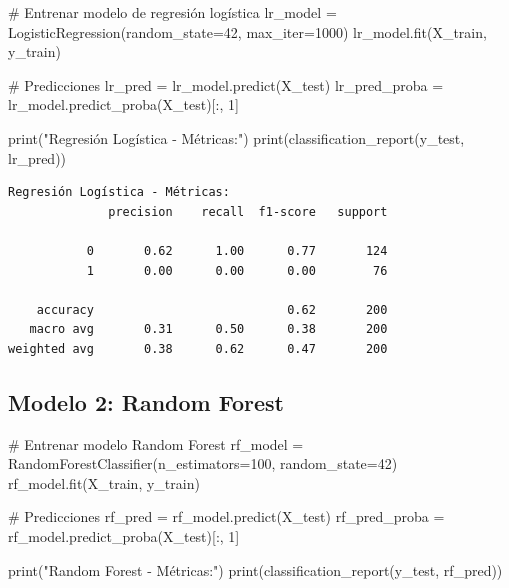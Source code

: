 \documentclass[
]{article}
\newenvironment{Shaded}{\begin{snugshade}}{\end{snugshade}}
\newcommand{\BuiltInTok}[1]{\textcolor[rgb]{0.00,0.23,0.31}{#1}}
\newcommand{\CommentTok}[1]{\textcolor[rgb]{0.37,0.37,0.37}{#1}}
\newcommand{\DecValTok}[1]{\textcolor[rgb]{0.68,0.00,0.00}{#1}}
\newcommand{\NormalTok}[1]{\textcolor[rgb]{0.00,0.23,0.31}{#1}}
\newcommand{\OperatorTok}[1]{\textcolor[rgb]{0.37,0.37,0.37}{#1}}
\newcommand{\StringTok}[1]{\textcolor[rgb]{0.13,0.47,0.30}{#1}}
\begin{document}
\label{logistic-regression}
\begin{Shaded}
\begin{Highlighting}[]
\CommentTok{\# Entrenar modelo de regresión logística}
\NormalTok{lr\_model }\OperatorTok{=}\NormalTok{ LogisticRegression(random\_state}\OperatorTok{=}\DecValTok{42}\NormalTok{, max\_iter}\OperatorTok{=}\DecValTok{1000}\NormalTok{)}
\NormalTok{lr\_model.fit(X\_train, y\_train)}

\CommentTok{\# Predicciones}
\NormalTok{lr\_pred }\OperatorTok{=}\NormalTok{ lr\_model.predict(X\_test)}
\NormalTok{lr\_pred\_proba }\OperatorTok{=}\NormalTok{ lr\_model.predict\_proba(X\_test)[:, }\DecValTok{1}\NormalTok{]}

\BuiltInTok{print}\NormalTok{(}\StringTok{"Regresión Logística {-} Métricas:"}\NormalTok{)}
\BuiltInTok{print}\NormalTok{(classification\_report(y\_test, lr\_pred))}
\end{Highlighting}
\end{Shaded}

\begin{verbatim}
Regresión Logística - Métricas:
              precision    recall  f1-score   support

           0       0.62      1.00      0.77       124
           1       0.00      0.00      0.00        76

    accuracy                           0.62       200
   macro avg       0.31      0.50      0.38       200
weighted avg       0.38      0.62      0.47       200
\end{verbatim}

\subsection{Modelo 2: Random Forest}\label{modelo-2-random-forest}

\label{random-forest}
\begin{Shaded}
\begin{Highlighting}[]
\CommentTok{\# Entrenar modelo Random Forest}
\NormalTok{rf\_model }\OperatorTok{=}\NormalTok{ RandomForestClassifier(n\_estimators}\OperatorTok{=}\DecValTok{100}\NormalTok{, random\_state}\OperatorTok{=}\DecValTok{42}\NormalTok{)}
\NormalTok{rf\_model.fit(X\_train, y\_train)}

\CommentTok{\# Predicciones}
\NormalTok{rf\_pred }\OperatorTok{=}\NormalTok{ rf\_model.predict(X\_test)}
\NormalTok{rf\_pred\_proba }\OperatorTok{=}\NormalTok{ rf\_model.predict\_proba(X\_test)[:, }\DecValTok{1}\NormalTok{]}

\BuiltInTok{print}\NormalTok{(}\StringTok{"Random Forest {-} Métricas:"}\NormalTok{)}
\BuiltInTok{print}\NormalTok{(classification\_report(y\_test, rf\_pred))}
\end{Highlighting}
\end{Shaded}
\end{document}

